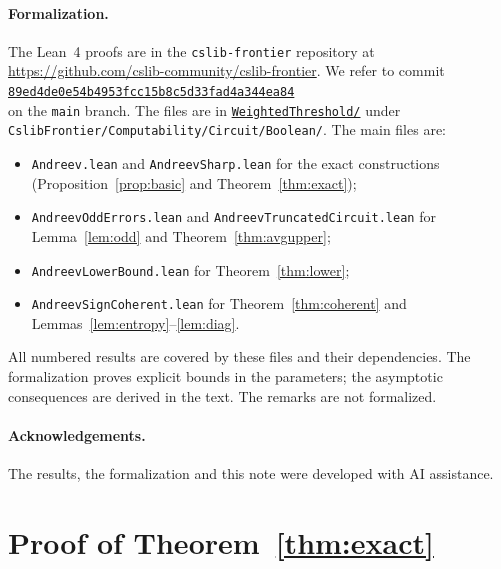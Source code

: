 \documentclass[11pt,letterpaper]{article}
\theoremstyle{remark}
\begin{document}
\paragraph*{Formalization.}
The Lean~4 proofs are in the \texttt{cslib-frontier} repository at
\url{https://github.com/cslib-community/cslib-frontier}.
We refer to commit\\
\href{https://github.com/cslib-community/cslib-frontier/commit/89ed4de0e54b4953fcc15b8c5d33fad4a344ea84}{\texttt{89ed4de0e54b4953fcc15b8c5d33fad4a344ea84}}\\
on the \texttt{main} branch. The files are in
\href{https://github.com/cslib-community/cslib-frontier/tree/89ed4de0e54b4953fcc15b8c5d33fad4a344ea84/CslibFrontier/Computability/Circuit/Boolean/WeightedThreshold}{\texttt{WeightedThreshold/}}
under \nolinkurl{CslibFrontier/Computability/Circuit/Boolean/}.
The main files are:
\begin{itemize}
\item \texttt{Andreev.lean} and \texttt{AndreevSharp.lean} for the exact
      constructions (Proposition~\ref{prop:basic} and Theorem~\ref{thm:exact});
\item \texttt{AndreevOddErrors.lean} and \texttt{AndreevTruncatedCircuit.lean}
      for Lemma~\ref{lem:odd} and Theorem~\ref{thm:avgupper};
\item \texttt{AndreevLowerBound.lean} for Theorem~\ref{thm:lower};
\item \texttt{AndreevSignCoherent.lean} for Theorem~\ref{thm:coherent} and
      Lemmas~\ref{lem:entropy}--\ref{lem:diag}.
\end{itemize}
All numbered results are covered by these files and their dependencies.
The formalization proves explicit bounds in the parameters; the asymptotic
consequences are derived in the text. The remarks are not formalized.

\paragraph*{Acknowledgements.}
The results, the formalization and this note were developed with AI
assistance.

\appendix
\section{Proof of Theorem~\ref{thm:exact}}\label{app:exact}
\end{document}
